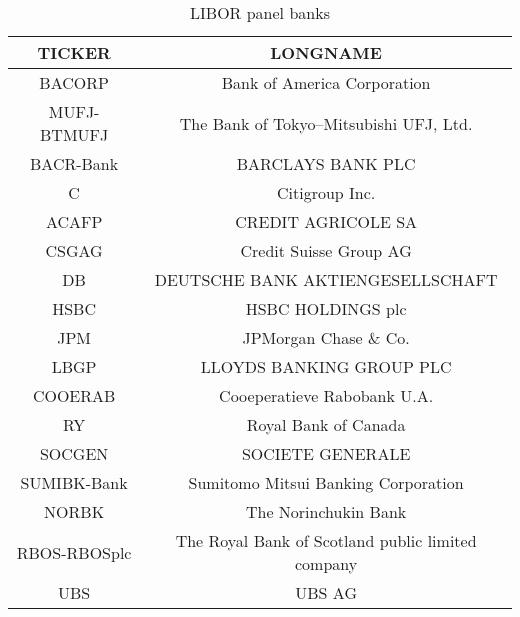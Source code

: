 \documentclass[12pt,a4paper]{article}
\theoremstyle{plain}
\numberwithin{equation}{section}
\begin{document}
\begin{table}[t]
\begin{center}
\begin{tabular}{|c|c|}
\toprule
\textbf{TICKER}	&	\textbf{LONGNAME}	\\
\midrule
\hline

BACORP	&	Bank of America Corporation	\\
MUFJ-BTMUFJ	&	The Bank of Tokyo--Mitsubishi UFJ, Ltd.	\\
BACR-Bank	&	BARCLAYS BANK PLC	\\
C	&	Citigroup Inc.	\\
ACAFP	&	CREDIT AGRICOLE SA	\\
CSGAG	&	Credit Suisse Group AG	\\
DB	&	DEUTSCHE BANK AKTIENGESELLSCHAFT	\\
HSBC	&	HSBC HOLDINGS plc	\\
JPM	&	JPMorgan Chase \& Co.	\\
LBGP	&	LLOYDS BANKING GROUP PLC	\\
COOERAB	&	Cooeperatieve Rabobank U.A.	\\
RY	&	Royal Bank of Canada	\\
SOCGEN	&	SOCIETE GENERALE	\\
SUMIBK-Bank	&	Sumitomo Mitsui Banking Corporation	\\
NORBK	&	The Norinchukin Bank	\\
RBOS-RBOSplc	&	The Royal Bank of Scotland public limited company	\\
UBS	&	UBS AG	\\
\bottomrule
\end{tabular}
\end{center}
\caption{LIBOR panel banks}\label{panel}
\end{table}
\end{document}
